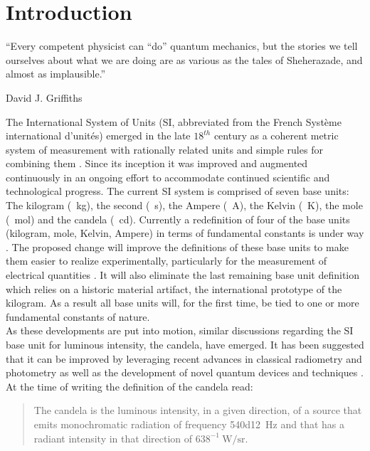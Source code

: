 

\chapter{Introduction}	\label{ch::introduction}

		\epigraph{``Every competent physicist can \enquote{do} quantum mechanics, but the stories we tell ourselves about what we are doing are as various as the tales of Sheherazade, and almost as implausible.''}{\textup{David J. Griffiths}}

		The International System of Units (SI, abbreviated from the French Syst\`eme international d'unit\'es) emerged in the late $18^{th}$ century as a coherent metric system of measurement with rationally related units and simple rules for combining them \cite{SIbrochure}. Since its inception it was improved and augmented continuously in an ongoing effort to accommodate continued scientific and technological progress. The current SI system is comprised of seven base units: The kilogram (\SI{}{\kg}), the second (\SI{}{\s}), the Ampere (\SI{}{\ampere}), the Kelvin (\SI{}{\kelvin}), the mole (\SI{}{\mole}) and the candela (\SI{}{\candela}). Currently a redefinition of four of the base units (kilogram, mole, Kelvin, Ampere) in terms of fundamental constants is under way \cite{0026-1394-44-1-010, SIHighlights2017}. The proposed change will improve the definitions of these base units to make them easier to realize experimentally, particularly for the measurement of electrical quantities \cite{zwinkels2010photometry}. It will also eliminate the last remaining base unit definition which relies on a historic material artifact, the international prototype of the kilogram. As a result all base units will, for the first time, be tied to one or more fundamental constants of nature.
		\\
		As these developments are put into motion, similar discussions regarding the SI base unit for luminous intensity, the candela, have emerged. It has been suggested that it can be improved by leveraging recent advances in classical radiometry and photometry as well as the development of novel quantum devices and techniques \cite{Cheung2007}.
		\\
		At the time of writing the definition of the candela read:

		\begin{quote}
			The candela is the luminous intensity, in a given direction, of a source that emits monochromatic radiation of frequency \SI{540d12}{\hertz} and that has a radiant intensity in that direction of $638^{-1} \SI{}{\watt\per\steradian}$.
		\end{quote}

